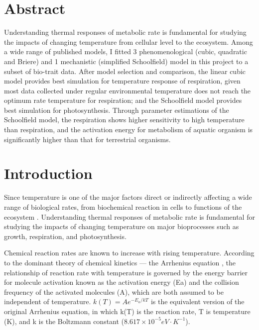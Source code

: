 \documentclass[11pt, a4paper]{article}
\begin{document}
\begin{spacing}{1.5}


\section*{Abstract}
Understanding thermal responses of metabolic rate is fundamental for studying the impacts of changing temperature from cellular level to the ecosystem. Among a wide range of published models, I fitted 3 phenomenological (cubic, quadratic and Briere) and 1 mechanistic (simplified Schoolfield) model in this project to a subset of bio-trait data. After model selection and comparison, the linear cubic model provides best simulation for temperature response of respiration, given most data collected under regular environmental temperature does not reach the optimum rate temperature for respiration; and the Schoolfield model provides best simulation for photosynthesis. Through parameter estimations of the Schoolfield model, the respiration shows higher sensitivity to high temperature than respiration, and the activation energy for metabolism of aquatic organism is significantly higher than that for terrestrial organisms.  

\linenumbers
\renewcommand\thesection{\arabic{section}}
\section{Introduction}

Since temperature is one of the major factors direct or indirectly affecting a wide range of biological rates, from biochemical reaction in cells to functions of the ecosystem \citep{brown2004toward, schulte2015effects}. Understanding thermal responses of metabolic rate is fundamental for studying the impacts of changing temperature on major bioprocesses such as growth, respiration, and photosynthesis. 

Chemical reaction rates are known to increase with rising temperature. According to the dominant theory of chemical kinetics --- the Arrhenius equation \citep{menzinger1969meaning}, the relationship of reaction rate with temperature is governed by the energy barrier for molecule activation known as the activation energy (Ea) and the collision frequency of the activated molecules (A), which are both assumed to be independent of temperature. $k(T)= Ae^{-E_a/kT}$ is the equivalent version of the original Arrhenius equation, in which k(T) is the reaction rate, T is temperature (K), and k is the Boltzmann constant ($8.617\times10^{-5}eV\cdot K^{-1}$).


\end{spacing}
\end{document}
